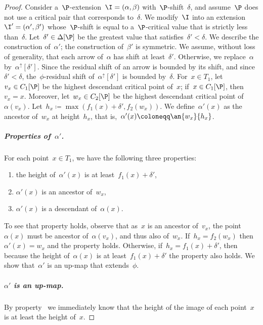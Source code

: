 \begin{proof}
Consider a~$\P$-extension~$\I = (\alpha, \beta)$ with~$\P$-shift~$\delta$, and assume~$\P$ does not use a critical pair that corresponds to~$\delta$.
We modify~$\I$ into an extension~$\I' = (\alpha', \beta')$ whose~$\P$-shift is equal to a~$\P$-critical value that is strictly less than~$\delta$.
Let~$\delta' \in \Delta[\P]$ be the greatest value that satisfies~$\delta' < \delta$.
We describe the construction of~$\alpha'$; the construction of~$\beta'$ is symmetric.
%
We assume, without loss of generality, that each arrow of~$\alpha$ has shift at least~$\delta'$.
Otherwise, we replace~$\alpha$ by~$\alpha^\uparrow[\delta']$.
Since the residual shift of an arrow is bounded by its shift, and since~$\delta' < \delta$, the~$\phi$-residual shift of~$\alpha^\uparrow[\delta']$ is bounded by~$\delta$.
For~$x \in T_1$, let~$v_x \in C_1[\P]$ be the highest descendant critical point of~$x$; if~$x \in C_1[\P]$, then~$v_x = x$.
Moreover, let~$w_x \in C_2[\P]$ be the highest descendant critical point of~$\alpha(v_x)$.
Let~$h_x \coloneqq \max(f_1(x) + \delta', f_2(w_x))$.
We define~$\alpha'(x)$ as the ancestor of~$w_x$ at height~$h_x$, that is,~$\alpha'(x) \coloneqq \an{w_x}{h_x}$.
%
\subparagraph*{Properties of~$\alpha'$.}
For each point~$x \in T_1$, we have the following three properties:
\begin{enumerate}[label={(\roman*)}]
    \item the height of~$\alpha'(x)$ is at least~$f_1(x) + \delta'$,
    \item $\alpha'(x)$ is an ancestor of~$w_x$,
    \item $\alpha'(x)$ is a descendant of~$\alpha(x)$.
\end{enumerate}
To see that property  holds, observe that as~$x$ is an ancestor of~$v_x$, the point~$\alpha(x)$ must be ancestor of~$\alpha(v_x)$, and thus also of~$w_x$.
If~$h_x = f_2(w_x)$ then~$\alpha'(x) = w_x$ and the property holds.
Otherwise, if~$h_x = f_1(x) + \delta'$, then because the height of~$\alpha(x)$ is at least~$f_1(x) + \delta'$ the property also holds.
We show that~$\alpha'$ is an up-map that extends~$\phi$.
%
\subparagraph*{$\alpha'$ is an up-map.}
By property~ we immediately know that the height of the image of each point~$x$ is at least the height of~$x$.

\end{proof}
